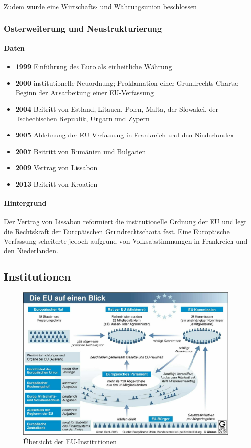\documentclass{article}
\begin{document}
	Zudem wurde eine Wirtschafts- und Währungsunion beschlossen

	\subsubsection{Osterweiterung und Neustrukturierung}
	\paragraph{Daten}
	\begin{itemize}
		\item \textbf{1999} Einführung des Euro als einheitliche Währung
		\item \textbf{2000} institutionelle Neuordnung; Proklamation einer Grundrechts-Charta; Beginn der Ausarbeitung einer EU-Verfassung
		\item \textbf{2004} Beitritt von Estland, Litauen, Polen, Malta, der Slowakei, der Tschechischen Republik, Ungarn und Zypern
		\item \textbf{2005} Ablehnung der EU-Verfassung in Frankreich und den Niederlanden
		\item \textbf{2007} Beitritt von Rumänien und Bulgarien
		\item \textbf{2009} Vertrag von Lissabon
		\item \textbf{2013} Beitritt von Kroatien
	\end{itemize}

	\paragraph{Hintergrund}
	Der Vertrag von Lissabon reformiert die institutionelle Ordnung der EU und legt die Rechtskraft der Europäischen Grundrechtscharta fest. Eine Europäische Verfassung scheiterte jedoch aufgrund von Volksabstimmungen in Frankreich und den Niederlanden.

	\subsection{Institutionen}

	\begin{figure}[!ht]
		\centering
  		\includegraphics[width=30em]{eu_institutionen.jpg}
  		\caption{Übersicht der EU-Institutionen}
  		\label{fig:eu_institutionen}
	\end{figure}
	
\end{document}
